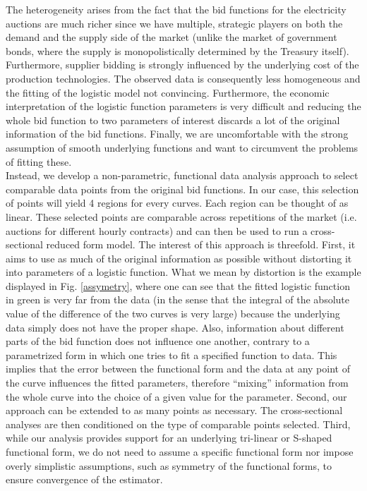 The heterogeneity arises from the fact that the bid functions for the electricity auctions are much richer since we have multiple, strategic players on both the demand and the supply side of the market (unlike the market of government bonds, where the supply is monopolistically determined by the Treasury itself). Furthermore, supplier bidding is strongly influenced by the underlying cost of the production technologies. The observed data is consequently less homogeneous and the fitting of the logistic model not convincing. Furthermore, the economic interpretation of the logistic function parameters is very difficult and reducing the whole bid function to two parameters of interest discards a lot of the original information of the bid functions. Finally, we are uncomfortable with the strong assumption of smooth underlying functions and want to circumvent the problems of fitting these.\\

Instead, we develop a non-parametric, functional data analysis approach to select comparable data points from the original bid functions. In our case, this selection of points will yield 4 regions for every curves. Each region can be thought of as linear. These selected points are comparable across repetitions of the market (i.e. auctions for different hourly contracts) and can then be used to run a cross-sectional reduced form model. The interest of this approach is threefold. First, it aims to use as much of the original information as possible without distorting it into parameters of a logistic function. What we mean by distortion is the example displayed in Fig. \ref{assymetry}, where one can see that the fitted logistic function in green is very far from the data (in the sense that the integral of the absolute value of the difference of the two curves is very large) because the underlying data simply does not have the proper shape. Also, information about different parts of the bid function does not influence one another, contrary to a parametrized form in which one tries to fit a specified function to data. This implies that the error between the functional form and the data at any point of the curve influences the fitted parameters, therefore ``mixing'' information from the whole curve into the choice of a given value for the parameter. Second, our approach can be extended to as many points as necessary. The cross-sectional analyses are then conditioned on the type of comparable points selected. Third, while our analysis provides support for an underlying tri-linear or S-shaped functional form, we do not need to assume a specific functional form nor impose overly simplistic assumptions, such as symmetry of the functional forms, to ensure convergence of the estimator.\\

